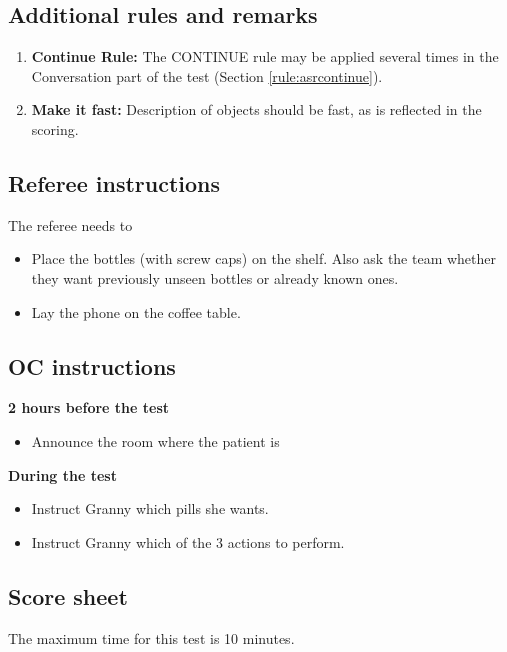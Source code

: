 \subsection{Additional rules and remarks}
\begin{enumerate}
\item \textbf{Continue Rule:} The CONTINUE rule may be applied several times in the Conversation part of the test (Section \ref{rule:asrcontinue}).
\item \textbf{Make it fast:} Description of objects should be fast, as is reflected in the scoring.
\end{enumerate}

\subsection{Referee instructions}

The referee needs to
\begin{itemize}
\item Place the bottles (with screw caps) on the shelf. Also ask the team whether they want previously unseen bottles or already known ones.
\item Lay the phone on the coffee table.
\end{itemize}

\subsection{OC instructions}

\textbf{2 hours before the test}
\begin{itemize}
\item Announce the room where the patient is
\end{itemize}
\textbf{During the test}
\begin{itemize}
\item Instruct Granny which pills she wants.
\item Instruct Granny which of the 3 actions to perform.
\end{itemize}

\subsection{Score sheet}

The maximum time for this test is 10 minutes.

